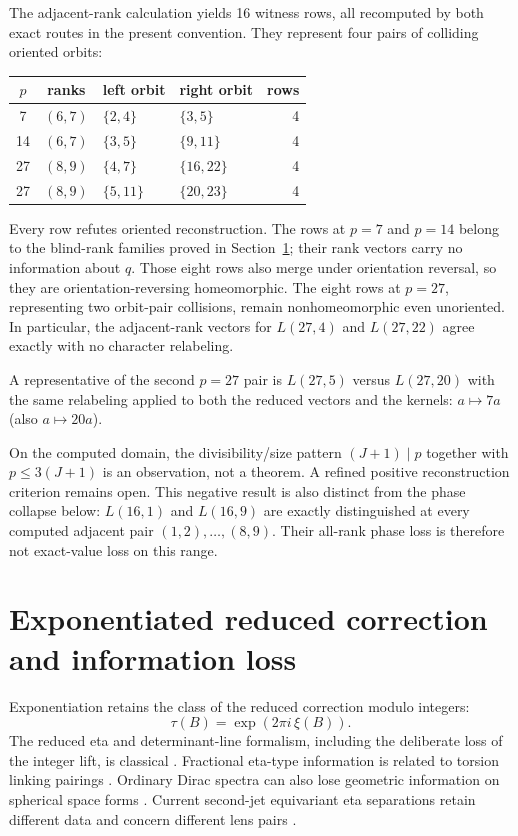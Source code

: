 \documentclass[11pt]{article}
\theoremstyle{definition}
\begin{document}
The adjacent-rank calculation yields 16 witness rows, all recomputed by both
exact routes in the present convention.  They represent
four pairs of colliding oriented orbits:
\begin{center}
\small
\begin{tabular}{@{}ccllr@{}}
\toprule
$p$ & ranks & left orbit & right orbit & rows\\
\midrule
7  & $(6,7)$ & $\{2,4\}$ & $\{3,5\}$ & 4\\
14 & $(6,7)$ & $\{3,5\}$ & $\{9,11\}$ & 4\\
27 & $(8,9)$ & $\{4,7\}$ & $\{16,22\}$ & 4\\
27 & $(8,9)$ & $\{5,11\}$ & $\{20,23\}$ & 4\\
\bottomrule
\end{tabular}
\end{center}
Every row refutes oriented reconstruction.  The rows at $p=7$ and $p=14$
belong to the blind-rank families proved in Section~\ref{sec:phases}; their
rank vectors carry no information about $q$.  Those eight rows also merge
under orientation reversal, so they are orientation-reversing
homeomorphic.  The eight rows at $p=27$, representing two orbit-pair
collisions, remain nonhomeomorphic even unoriented.  In particular, the
adjacent-rank vectors for $L(27,4)$ and $L(27,22)$ agree exactly with no
character relabeling.

A representative of the second $p=27$ pair is $L(27,5)$ versus $L(27,20)$
with the same relabeling applied to both the reduced vectors and the kernels:
$a\mapsto7a$ (also $a\mapsto20a$).

On the computed domain, the divisibility/size pattern
$(J+1)\mid p$ together with $p\leq3(J+1)$ is an observation, not a theorem.
A refined positive reconstruction criterion remains open.  This negative
result is also distinct from the phase collapse below: $L(16,1)$ and
$L(16,9)$ are exactly distinguished at every computed adjacent pair
$(1,2),\ldots,(8,9)$.  Their all-rank phase loss is therefore not exact-value
loss on this range.

\section{Exponentiated reduced correction and information loss}
\label{sec:phases}

Exponentiation retains the class of the reduced correction modulo integers:
\[
 \tau(B)=\exp(2\pi i\,\xi(B)).
\]
The reduced eta and determinant-line formalism, including the deliberate loss
of the integer lift, is classical
\cite[arXiv v4, pp.~1, 6--8, 12--13]{DaiFreed1994}.  Fractional eta-type information is
related to torsion linking pairings
\cite[arXiv v2, pp.~2, 15, 18]{SavinSternin2002}.  Ordinary Dirac spectra can also lose
geometric information on spherical space forms
\cite[pp.~80--82, Thm.~5]{Bar1996}.  Current second-jet equivariant eta
separations retain different data and concern different lens pairs
\cite[Thm.~1.1, Thm.~4.2, Thm.~5.14, Cor.~5.30]{Sharma2026}.
\end{document}
